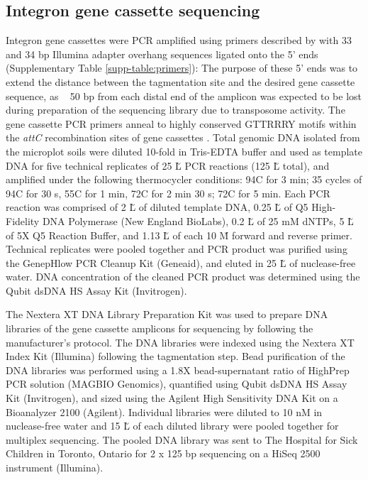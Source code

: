 \subsection{Integron gene cassette sequencing}

Integron gene cassettes were PCR amplified using primers described by \cite{Stokes.2001} with 33 and 34 bp Illumina adapter overhang sequences ligated onto the 5’ ends (Supplementary Table \ref{supp-table:primers}):
The purpose of these 5’ ends was to extend the distance between the tagmentation site and the desired gene cassette sequence, as ~ 50 bp from each distal end of the amplicon was expected to be lost during preparation of the sequencing library due to transposome activity.
The gene cassette PCR primers anneal to highly conserved GTTRRRY motifs within the \textit{attC} recombination sites of gene cassettes \dummyfig.
Total genomic DNA isolated from the microplot soils were diluted 10-fold in Tris-EDTA buffer and used as template DNA for five technical replicates of 25 \u L PCR reactions (125 \u L total), and amplified under the following thermocycler conditions:
94\degree C for 3 min; 35 cycles of 94\degree C for 30 s, 55\degree C for 1 min, 72\degree C for 2 min 30 s; 72\degree C for 5 min.
Each PCR reaction was comprised of 2 \u L of diluted template DNA, 0.25 \u L of Q5\textsuperscript{\textregistered{}} High-Fidelity DNA Polymerase (New England BioLabs), 0.2 \u L of 25 mM dNTPs, 5 \u L of 5X Q5\textsuperscript{\textregistered{}} Reaction Buffer, and 1.13 \u L of each 10 \u M forward and reverse primer.
Technical replicates were pooled together and PCR product was purified using the GenepHlow PCR Cleanup Kit (Geneaid), and eluted in 25 \u L of nuclease-free water.
DNA concentration of the cleaned PCR product was determined using the Qubit\textsuperscript{\texttrademark{}} dsDNA HS Assay Kit (Invitrogen).

The Nextera\textsuperscript{\textregistered{}} XT DNA Library Preparation Kit was used to prepare DNA libraries of the gene cassette amplicons for sequencing by following the manufacturer’s protocol.
The DNA libraries were indexed using the Nextera\textsuperscript{\textregistered{}} XT Index Kit (Illumina) following the tagmentation step.
Bead purification of the DNA libraries was performed using a 1.8X bead-supernatant ratio of HighPrep\textsuperscript{\texttrademark{}} PCR solution (MAGBIO Genomics), quantified using Qubit\textsuperscript{\texttrademark{}} dsDNA HS Assay Kit (Invitrogen), and sized using the Agilent High Sensitivity DNA Kit on a Bioanalyzer 2100 (Agilent).
Individual libraries were diluted to 10 nM in nuclease-free water and 15 \u L of each diluted library were pooled together for multiplex sequencing.
The pooled DNA library was sent to The Hospital for Sick Children in Toronto, Ontario for 2 x 125 bp sequencing on a HiSeq 2500 instrument (Illumina).

